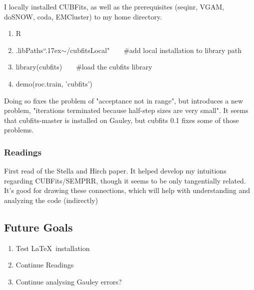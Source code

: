\documentclass[11pt]{article} %
\begin{document}
I locally installed CUBFits, as well as the prerequisites (seqinr, VGAM, doSNOW,  coda, EMCluster) to my home directory.

\begin{enumerate}
\item R
\item .libPaths{``{\raise.17ex\hbox{$\scriptstyle\sim$}}/cubfitsLocal"}~~~~\#add local installation to library path
\item library(cubfits)~~~~\#load the cubfits library
\item demo(roc.train, 'cubfits')
\end{enumerate}

Doing so fixes the problem of "acceptance not in range", but introduces a new problem, "iterations terminated because half-step sizes are very small". It seems that cubfits-master is installed on Gauley, but cubfits 0.1 fixes some of those problems.



\subsubsection{Readings}
First read of the Stella and Hirch paper. It helped develop my intuitions regarding CUBFits/SEMPRR, though it seems to be only tangentially related. It's good for drawing these connections, which will help with understanding and analyzing the code (indirectly)

\subsection{Future Goals}
\begin{enumerate}
\item Test \LaTeX~installation
\item Continue Readings
\item Continue analysing Gauley errors?
\end{enumerate}
\end{document}
